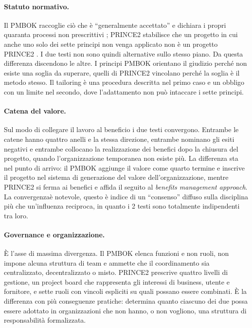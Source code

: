 \paragraph{Statuto normativo.} Il PMBOK raccoglie ci\`o che \`e ``generalmente
accettato'' e dichiara i propri quaranta processi non prescrittivi
\cite{pmbok8}; PRINCE2 stabilisce che un progetto in cui anche uno solo dei
sette principi non venga applicato non \`e un progetto PRINCE2 \cite{prince27}.
I due testi non sono quindi alternative sullo stesso piano. Da
questa differenza discendono le altre. I principi PMBOK orientano il giudizio
perch\'e non esiste una soglia da superare, quelli di PRINCE2 vincolano perch\'e
la soglia \`e il metodo stesso. Il tailoring \`e una procedura descritta nel
primo caso e un obbligo con un limite nel secondo, dove l'adattamento non pu\`o
intaccare i sette principi.

\paragraph{Catena del valore.} Sul modo di collegare il lavoro al beneficio i
due testi convergono. Entrambe le catene hanno quattro anelli e la stessa
direzione, entrambe nominano gli esiti negativi e entrambe collocano la
realizzazione dei benefici dopo la chiusura del progetto, quando
l'organizzazione temporanea non esiste pi\`u. La differenza sta nel punto di
arrivo: il PMBOK aggiunge il valore come quarto termine e inscrive il progetto
nel sistema di generazione del valore dell'organizzazione, mentre PRINCE2 si
ferma ai benefici e affida il seguito al \emph{benefits management approach}. La
convergenza\`e notevole, questo \`e indice di un ``consenso'' diffuso sulla
disciplina pi\`u che un'influenza reciproca, in quanto i 2 testi sono totalmente
indipendenti tra loro.

\paragraph{Governance e organizzazione.} \`E l'asse di massima divergenza. Il
PMBOK elenca funzioni e non ruoli, non impone alcuna struttura di team e ammette
che il coordinamento sia centralizzato, decentralizzato o misto. PRINCE2
prescrive quattro livelli di gestione, un project board che rappresenta gli
interessi di business, utente e fornitore, e sette ruoli con vincoli espliciti
su quali possano essere combinati. \`E la differenza con pi\`u conseguenze
pratiche: determina quanto ciascuno dei due possa essere adottato in
organizzazioni che non hanno, o non vogliono, una struttura di responsabilit\`a
formalizzata.

